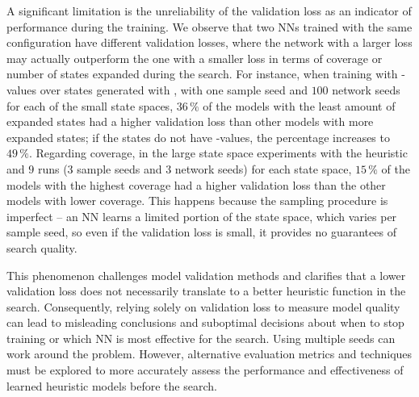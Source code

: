 A significant limitation is the unreliability of the validation loss as an indicator of performance during the training. We observe that two NNs trained with the same configuration have different validation losses, where the network with a larger loss may actually outperform the one with a smaller loss in terms of coverage or number of states expanded during the search. For instance, when training with \hstar-values over states generated with \bfsrw, with one sample seed and $100$ network seeds for each of the small state spaces, $36\,\%$ of the models with the least amount of expanded states had a higher validation loss than other models with more expanded states; if the states do not have \hstar-values, the percentage increases to $49\,\%$. Regarding coverage, in the large state space experiments with the heuristic \hnnrs and $9$ runs ($3$ sample seeds and $3$ network seeds) for each state space, $15\,\%$ of the models with the highest coverage had a higher validation loss than the other models with lower coverage. This happens because the sampling procedure is imperfect -- an NN learns a limited portion of the state space, which varies per sample seed, so even if the validation loss is small, it provides no guarantees of search quality.

This phenomenon challenges model validation methods and clarifies that a lower validation loss does not necessarily translate to a better heuristic function in the search. Consequently, relying solely on validation loss to measure model quality can lead to misleading conclusions and suboptimal decisions about when to stop training or which NN is most effective for the search. Using multiple seeds can work around the problem. However, alternative evaluation metrics and techniques must be explored to more accurately assess the performance and effectiveness of learned heuristic models before the search.

